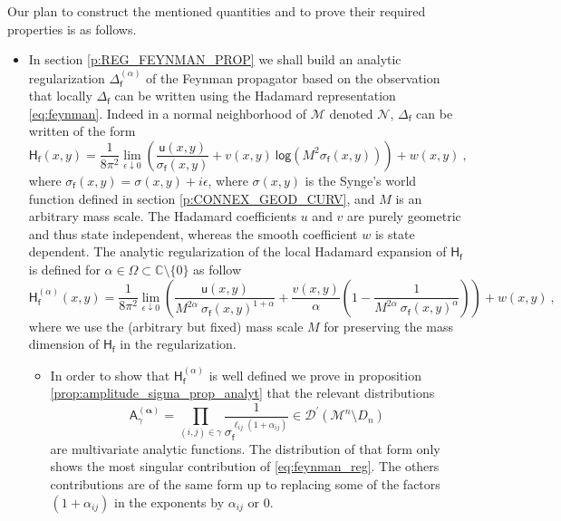 \documentclass[11pt]{book}
\newcommand{\alphabd}{\boldsymbol{\alpha}}
\renewcommand{\log}{\mathsf{log}}
\newcommand{\Dcal}{\mathcal{D}}
\newcommand{\Mcal}{\mathcal{M}}
\newcommand{\Ncal}{\mathcal{N}}
\newcommand{\Cbb}{\mathbb{C}}
\newcommand{\Asf}{\mathsf{A}}
\newcommand{\Hsf}{\mathsf{H}}
\newcommand{\fsf}{\mathsf{f}}
\newcommand{\usf}{\mathsf{u}}
\theoremstyle{break}
\begin{document}
\bigskip


Our plan to construct the mentioned quantities and to prove their required properties is as follows.


\begin{itemize}


\item In section \ref{p:REG_FEYNMAN_PROP} we shall build an analytic regularization $\Delta^{(\alpha)}_\fsf$ of the Feynman propagator based on the observation that locally $\Delta_\fsf$ can be written using the Hadamard representation \eqref{eq:feynman}. Indeed in a normal neighborhood of $\Mcal$ denoted $\Ncal$, $\Delta_\fsf$ can be written of the form
%
\begin{equation}
\Hsf_\fsf(x,y) = \frac{1}{8\pi^2}  \lim_{\epsilon \downarrow 0} \left( \frac{\usf(x,y)}{\sigma_\fsf(x,y)} + v(x,y) \ \log\left( M^2 \sigma_\fsf(x,y)\right) \right) + w(x,y) \ ,
\label{eq:feynman} 
\end{equation}
%
where $\sigma_\fsf(x,y) = \sigma(x,y) + i \epsilon$, where $\sigma(x,y)$ is the Synge's world function defined in section \ref{p:CONNEX_GEOD_CURV}, and $M$ is an arbitrary mass scale. The Hadamard coefficients $u$ and $v$ are purely geometric and thus state independent, whereas the smooth coefficient $w$ is state dependent. The analytic regularization of the local Hadamard expansion of $\Hsf_\fsf$ is defined for $\alpha \in \Omega \subset \Cbb \setminus \{0\}$ as follow 
%
\begin{equation}
\Hsf^{(\alpha)}_\fsf(x,y) = \frac{1}{8\pi^2} \lim_{\epsilon \downarrow 0} \left( \frac{\usf(x,y)}{M^{2\alpha} \ \sigma_\fsf(x,y)^{1+\alpha}} + \frac{v(x,y)}{\alpha} \left( 1 - \frac{1}{ M^{2\alpha} \ \sigma_\fsf(x,y)^{\alpha} } \right) \right) + w(x,y) \ ,
\label{eq:feynman_reg}
\end{equation}
%
where we use the (arbitrary but fixed) mass scale $M$ for preserving the mass dimension of $\Hsf_\fsf$ in the regularization. 


\begin{itemize}


\item In order to show that $\Hsf^{(\alpha)}_\fsf$ is well defined we prove in proposition \ref{prop:amplitude_sigma_prop_analyt} that the relevant distributions 
%
\begin{equation*}
\Asf_\gamma^{(\alphabd)} = \prod_{(i,j)\in\gamma} \frac{1}{\sigma_\fsf^{\ell_{ij}(1+\alpha_{ij})}} \in \Dcal^\prime(\Mcal^n\setminus D_n)
\end{equation*}
%
are multivariate analytic functions. The distribution of that form only shows the most singular contribution of \eqref{eq:feynman_reg}. The others contributions are of the same form up to replacing some of the factors $(1+\alpha_{ij})$ in the exponents by $\alpha_{ij}$ or $0$.



\end{itemize}
\end{itemize}
\end{document}
